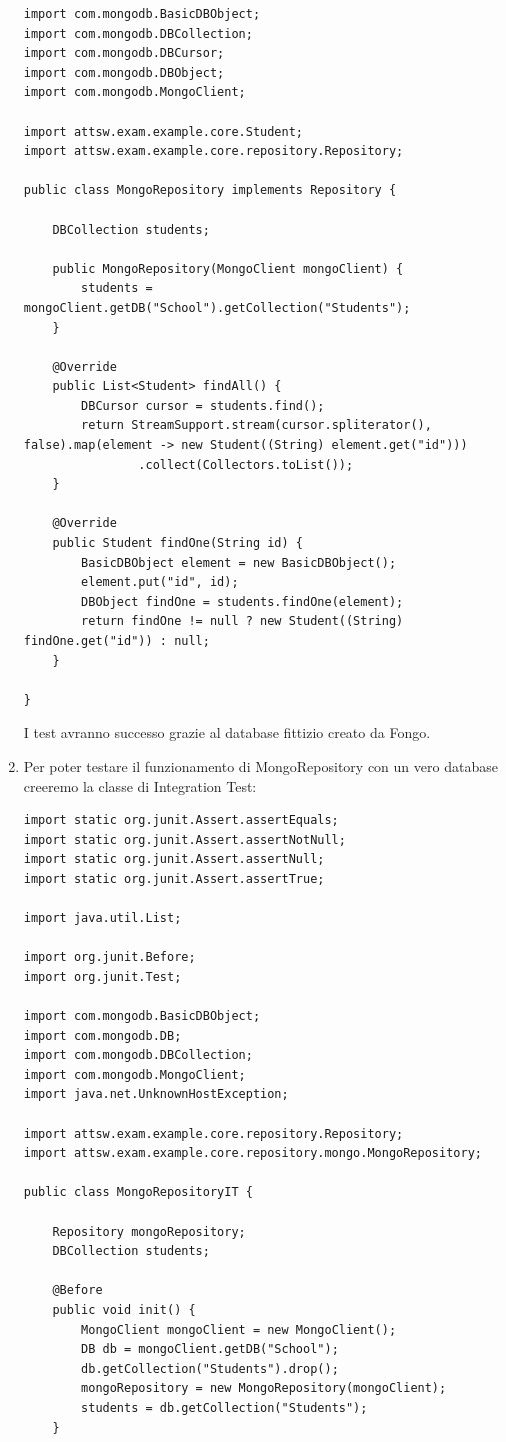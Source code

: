 \begin{enumerate}
\begin{lstlisting}[frame=single]
import com.mongodb.BasicDBObject;
import com.mongodb.DBCollection;
import com.mongodb.DBCursor;
import com.mongodb.DBObject;
import com.mongodb.MongoClient;

import attsw.exam.example.core.Student;
import attsw.exam.example.core.repository.Repository;

public class MongoRepository implements Repository {
	
	DBCollection students;

	public MongoRepository(MongoClient mongoClient) {
		students = mongoClient.getDB("School").getCollection("Students");
	}

	@Override
	public List<Student> findAll() {
		DBCursor cursor = students.find();
		return StreamSupport.stream(cursor.spliterator(), false).map(element -> new Student((String) element.get("id")))
				.collect(Collectors.toList());
	}

	@Override
	public Student findOne(String id) {
		BasicDBObject element = new BasicDBObject();
		element.put("id", id);
		DBObject findOne = students.findOne(element);
		return findOne != null ? new Student((String) findOne.get("id")) : null;
	}

}
  \end{lstlisting}
  I test avranno successo grazie al database fittizio creato da Fongo.
  \item Per poter testare il funzionamento di MongoRepository con un vero database creeremo la classe di Integration Test:
   \begin{lstlisting}[frame=single]
import static org.junit.Assert.assertEquals;
import static org.junit.Assert.assertNotNull;
import static org.junit.Assert.assertNull;
import static org.junit.Assert.assertTrue;

import java.util.List;

import org.junit.Before;
import org.junit.Test;

import com.mongodb.BasicDBObject;
import com.mongodb.DB;
import com.mongodb.DBCollection;
import com.mongodb.MongoClient;
import java.net.UnknownHostException;

import attsw.exam.example.core.repository.Repository;
import attsw.exam.example.core.repository.mongo.MongoRepository;

public class MongoRepositoryIT {

	Repository mongoRepository;
	DBCollection students;

	@Before
	public void init() {
		MongoClient mongoClient = new MongoClient();
		DB db = mongoClient.getDB("School");
		db.getCollection("Students").drop();
		mongoRepository = new MongoRepository(mongoClient);
		students = db.getCollection("Students");
	}


\end{lstlisting}
\end{enumerate}
